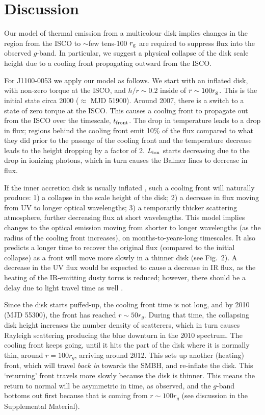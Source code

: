 \documentclass{nature}
\begin{document}
\section{Discussion}   
Our model of thermal emission from a multicolour disk implies 
changes in the region from the ISCO to $\sim$few tens-100 $r_{\rm g}$
are required to suppress flux into the observed
$g$-band. In particular, we suggest a physical collapse of the disk
scale height due to a cooling front propagating outward from the ISCO.

For J1100-0053 we apply our model as follows. We start with an inflated
disk, with non-zero torque at the ISCO, and $h/r\sim0.2$ inside of
$r\sim100 r_{\rm g}$.  This is the initial state circa 2000
($\approx$ MJD 51900).  Around 2007, there is a switch to a state of
zero torque at the ISCO. This causes a cooling front to propagate 
out from the ISCO over the timescale, $t_{\rm front}$. The drop in temperature 
leads to a drop in flux; regions behind
the cooling front emit 10\% of the flux compared to what they did prior to the
passage of the cooling front and the temperature decrease leads to the height 
dropping by a factor of 2.  $L_{\rm ion}$ starts decreasing due to the
drop in ionizing photons, which in turn causes the Balmer lines to 
decrease in flux.

If the inner accretion disk is usually inflated \cite[see e.g.,
][]{Sirko_Goodman2003, Thompson2005, Hopkins_Quataert2011}, such a
cooling front will naturally produce: 1) a collapse in the scale
height of the disk; 2) a decrease in flux moving from UV to longer
optical wavelengths; 3) a temporarily thicker scattering atmosphere,
further decreasing flux at short wavelengths.  This model implies
changes to the optical emission moving from shorter to longer
wavelengths (as the radius of the cooling front increases), on
months-to-years-long timescales. It also predicts a longer time to
recover the original flux (compared to the initial collapse) as a
front will move more slowly in a thinner disk (see Fig.~2). A decrease
in the UV flux would be expected to cause a decrease in IR flux, as
the heating of the IR-emitting dusty torus is reduced; however, there
should be a delay due to light travel time as well \cite[e.g.,
][]{Jun2015}.

Since the disk starts puffed-up, the cooling front time is not long,
and by 2010 (MJD 55300), the front has reached $r\sim50 r_{g}$. During
that time, the collapsing disk height increases the number density of
scatterers, which in turn causes Rayleigh scattering producing the
blue downturn in the 2010 spectrum.  The cooling front keeps going,
until it hits the part of the disk where it is normally thin, around
$r=100 r_g$, arriving around 2012. This sets up another (heating)
front, which will travel {\it back in} towards the SMBH, and
re-inflate the disk. This `returning' front travels more slowly
because the disk is thinner. This means the return to normal will be
asymmetric in time, as observed, and the $g$-band bottoms out first
because that is coming from $r\sim100r_{g}$ (see discussion in the
Supplemental Material).
\end{document}

